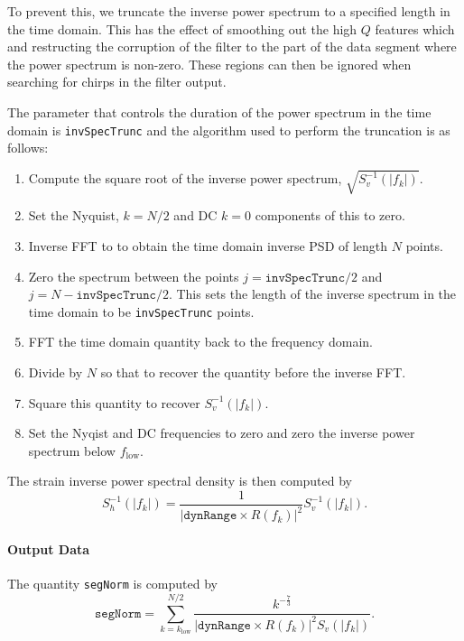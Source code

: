 To prevent this, we truncate the inverse power spectrum to a specified length
in the time domain. This has the effect of smoothing out the high $Q$ features
which and restructing the corruption of the filter to the part of the data
segment where the power spectrum is non-zero. These regions can then be
ignored when searching for chirps in the filter output.

The parameter that controls the duration of the power spectrum in the time
domain is \texttt{invSpecTrunc} and the algorithm used to perform the
truncation is as follows:
\begin{enumerate}
\item Compute the square root of the inverse power spectrum,
$\sqrt{S^{-1}_v(|f_k|)}$.
\item Set the Nyquist, $k = N/2$ and DC $k = 0$ components of this to zero.
\item Inverse FFT to to obtain the time domain inverse PSD of length $N$
points.
\item Zero the spectrum between the points $j = \mathtt{invSpecTrunc}/2$ and
$j = N - \mathtt{invSpecTrunc}/2$. This sets the length of the inverse
spectrum in the time domain to be \texttt{invSpecTrunc} points.
\item FFT the time domain quantity back to the frequency domain.
\item Divide by $N$ so that to recover the quantity before the inverse FFT.
\item Square this quantity to recover $S^{-1}_v(|f_k|)$.
\item Set the Nyqist and DC frequencies to zero and zero the inverse power
spectrum below $f_{\mathrm{low}}$.
\end{enumerate}

The strain inverse power spectral density is then computed by
\begin{equation}
S^{-1}_h(|f_k|) = \frac{1}{\left|\mathtt{dynRange} \times R(f_k)\right|^2}
 S^{-1}_v(|f_k|).
\end{equation}

\paragraph*{Output Data}
The quantity \texttt{segNorm} is computed by
\begin{equation}
\mathtt{segNorm} =
   \sum_{k = k_{\mathrm{low}}}^{N/2} \frac{k^{-\frac{7}{3}}}
   {\left|\mathtt{dynRange}\times R(f_k)\right|^2 S_v(|f_k|)}.
\end{equation}

